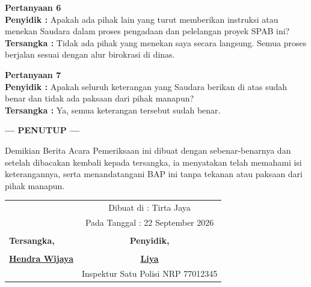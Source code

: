 \documentclass[12pt,a4paper]{article}
\begin{document}
\vspace{0.2cm}
\textbf{Pertanyaan 6} \\
\textbf{Penyidik :} Apakah ada pihak lain yang turut memberikan instruksi atau menekan Saudara dalam proses pengadaan dan pelelangan proyek SPAB ini? \\
\textbf{Tersangka :} Tidak ada pihak yang menekan saya secara langsung. Semua proses berjalan sesuai dengan alur birokrasi di dinas.

\vspace{0.2cm}
\textbf{Pertanyaan 7} \\
\textbf{Penyidik :} Apakah seluruh keterangan yang Saudara berikan di atas sudah benar dan tidak ada paksaan dari pihak manapun? \\
\textbf{Tersangka :} Ya, semua keterangan tersebut sudah benar.

\vspace{0.5cm}
\begin{center}
    \textbf{--- PENUTUP ---}
\end{center}

Demikian Berita Acara Pemeriksaan ini dibuat dengan sebenar-benarnya dan setelah dibacakan kembali kepada tersangka, ia menyatakan telah memahami isi keterangannya, serta menandatangani BAP ini tanpa tekanan atau paksaan dari pihak manapun.

\vspace{0.5cm}

\begin{tabularx}{\textwidth}{X c}
    & Dibuat di : Tirta Jaya \\
    & Pada Tanggal : 22 September 2026 \\
    & \\
    \textbf{Tersangka,} & \textbf{Penyidik,} \\
    \vspace{1.5cm} & \\
    \underline{\textbf{Hendra Wijaya}} & \underline{\textbf{Liya}} \\
    & Inspektur Satu Polisi NRP 77012345
\end{tabularx}
\end{document}
